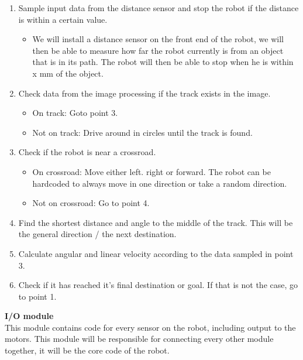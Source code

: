 \documentclass[11pt]{article}
\begin{document}
\begin{enumerate}
    \item Sample input data from the distance sensor and stop the robot if the distance is within a certain value. \begin{itemize}
        \item We will install a distance sensor on the front end of the robot, we will then be able to measure how far the robot currently is from an object that is in its path. The robot will then be able to stop when he is within x mm of the object. 
    \end{itemize}
    \item Check data from the image processing if the track exists in the image. \begin{itemize}
        \item On track: Goto point 3. 
        \item Not on track: Drive around in circles until the track is found.
    \end{itemize}
    \item Check if the robot is near a crossroad. \begin{itemize}
        \item On crossroad: Move either left. right or forward. The robot can be hardcoded to always move in one direction or take a random direction. 
        \item Not on crossroad: Go to point 4. 
    \end{itemize}
    \item Find the shortest distance and angle to the middle of the track. This will be the general direction / the next destination. 
    \item Calculate angular and linear velocity according to the data sampled in point 3. 
    \item Check if it has reached it's final destination or goal. If that is not the case, go to point 1.
\end{enumerate}
\textbf{I/O module}
\\
This module contains code for every sensor on the robot, including output to the motors. This module will be responsible for connecting every other module together, it will be the core code of the robot. 
\\\\
\end{document}
